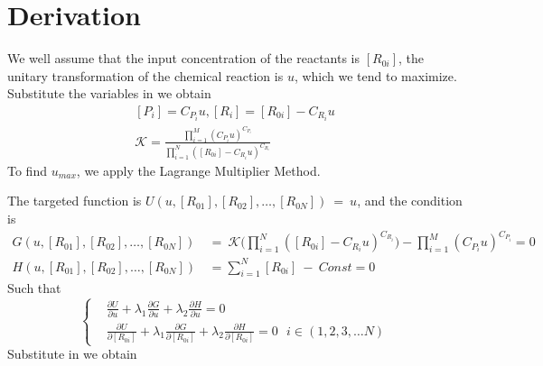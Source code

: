 \documentclass{article}
\begin{document}
\section{Derivation}
We well assume that the input concentration of the reactants is $[R_{0i}]$, the unitary transformation of the chemical reaction is $u$, which we tend to maximize. Substitute the variables in we obtain
\begin{equation}
\begin{aligned}
    [P_i] = C_{P_i}u, [R_i] = [R_{0i}] - C_{R_i}u \\
    \mathscr{K} = \frac{\prod^{M}_{i=1}(C_{P_i}u)^{C_{P_i}}}{\prod^{N}_{i=1}([R_{0i}] - C_{R_i}u)^{C_{R_i}}}
\end{aligned}
\end{equation}
To find $u_{max}$, we apply the Lagrange Multiplier Method.
\par \indent The targeted function is $U(u,[R_{01}],[R_{02}], \dots,[R_{0N}])~ = ~u$, and the condition is
\begin{equation}
\begin{aligned}
    G(u,[R_{01}],[R_{02}], \dots,[R_{0N}])~ &=~\mathscr{K}\bigg(\prod^{N}_{i=1}([R_{0i}]-C_{R_i}u)^{C_{R_i}}\bigg) - \prod^{M}_{i=1}(C_{P_i}u)^{C_{P_i}} = 0 \\
    H(u,[R_{01}],[R_{02}], \dots,[R_{0N}]) &= \sum_{i=1}^{N}[R_{0i}] ~-~Const = 0
\end{aligned}
\end{equation}
\clearpage
Such that 
\begin{equation}
\left\{
\begin{aligned}
    & \frac{\partial U}{\partial u} + \lambda_1 \frac{\partial G}{\partial u}  + \lambda_2 \frac{\partial H}{\partial u}= 0 \\
    & \frac{\partial U}{\partial [R_{0i}]} + \lambda_1 \frac{\partial G}{\partial [R_{0i}]} + \lambda_2 \frac{\partial H}{\partial [R_{0i}]} = 0 ~~~ i \in (1, 2, 3, \dots N)
\end{aligned}             
\right.
\end{equation}
Substitute in we obtain
\end{document}
